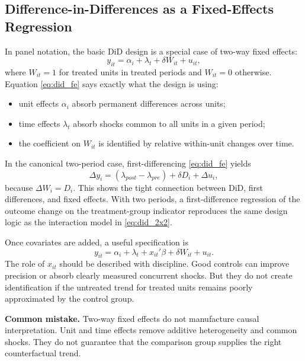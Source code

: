 \subsection{Difference-in-Differences as a Fixed-Effects Regression}
In panel notation, the basic \ac{DiD} design is a special case of two-way fixed effects:
\begin{equation}
y_{it} = \alpha_i + \lambda_t + \delta W_{it} + u_{it},
\label{eq:did_fe}
\end{equation}
where $W_{it}=1$ for treated units in treated periods and $W_{it}=0$ otherwise. Equation \eqref{eq:did_fe} says exactly what the design is using:
\begin{itemize}
\item unit effects $\alpha_i$ absorb permanent differences across units;
\item time effects $\lambda_t$ absorb shocks common to all units in a given period;
\item the coefficient on $W_{it}$ is identified by relative within-unit changes over time.
\end{itemize}

In the canonical two-period case, first-differencing \eqref{eq:did_fe} yields
\begin{equation}
\Delta y_i = (\lambda_{post}-\lambda_{pre}) + \delta D_i + \Delta u_i,
\label{eq:did_first_difference}
\end{equation}
because $\Delta W_i = D_i$. This shows the tight connection between \ac{DiD}, first differences, and fixed effects. With two periods, a first-difference regression of the outcome change on the treatment-group indicator reproduces the same design logic as the interaction model in \eqref{eq:did_2x2}.

Once covariates are added, a useful specification is
\begin{equation}
y_{it} = \alpha_i + \lambda_t + x_{it}'\beta + \delta W_{it} + u_{it}.
\label{eq:did_fe_controls}
\end{equation}
The role of $x_{it}$ should be described with discipline. Good controls can improve precision or absorb clearly measured concurrent shocks. But they do not create identification if the untreated trend for treated units remains poorly approximated by the control group.

\begin{boxF}
\textbf{Common mistake.}
Two-way fixed effects do not manufacture causal interpretation. Unit and time effects remove additive heterogeneity and common shocks. They do not guarantee that the comparison group supplies the right counterfactual trend.
\end{boxF}

